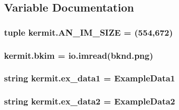 \subsection{Variable Documentation}
\subsubsection[{\texorpdfstring{A\+N\+\_\+\+I\+M\+\_\+\+S\+I\+ZE}{AN_IM_SIZE}}]{\setlength{\rightskip}{0pt plus 5cm}tuple kermit.\+A\+N\+\_\+\+I\+M\+\_\+\+S\+I\+ZE = (554,672)}\hypertarget{namespacekermit_a3a00797e39aca7adb4a8cbfa3406d08a}{}\label{namespacekermit_a3a00797e39aca7adb4a8cbfa3406d08a}
\subsubsection[{\texorpdfstring{bkim}{bkim}}]{\setlength{\rightskip}{0pt plus 5cm}kermit.\+bkim = io.\+imread(\textquotesingle{}bknd.\+png\textquotesingle{})}\hypertarget{namespacekermit_a0744c104c9fe9a76f9518b49a1df33b2}{}\label{namespacekermit_a0744c104c9fe9a76f9518b49a1df33b2}
\subsubsection[{\texorpdfstring{ex\+\_\+data1}{ex_data1}}]{\setlength{\rightskip}{0pt plus 5cm}string kermit.\+ex\+\_\+data1 = \textquotesingle{}Example\+Data1\textquotesingle{}}\hypertarget{namespacekermit_adf8dfb894042e43e52e8c1fb73ee6b5c}{}\label{namespacekermit_adf8dfb894042e43e52e8c1fb73ee6b5c}
\subsubsection[{\texorpdfstring{ex\+\_\+data2}{ex_data2}}]{\setlength{\rightskip}{0pt plus 5cm}string kermit.\+ex\+\_\+data2 = \textquotesingle{}Example\+Data2\textquotesingle{}}\hypertarget{namespacekermit_a840f1a32f7048a0fa6a2ccb4d98f52eb}{}\label{namespacekermit_a840f1a32f7048a0fa6a2ccb4d98f52eb}
